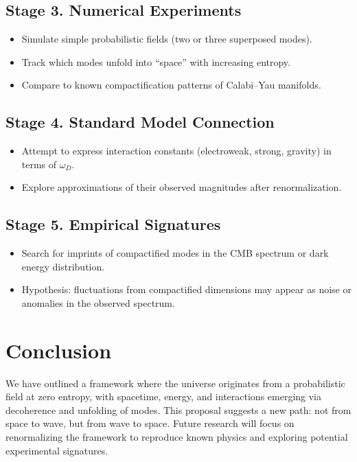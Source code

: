 \documentclass[12pt,a4paper]{article}
\begin{document}
\subsection*{Stage 3. Numerical Experiments}
\begin{itemize}
  \item Simulate simple probabilistic fields (two or three superposed modes).
  \item Track which modes unfold into ``space'' with increasing entropy.
  \item Compare to known compactification patterns of Calabi--Yau manifolds.
\end{itemize}

\subsection*{Stage 4. Standard Model Connection}
\begin{itemize}
  \item Attempt to express interaction constants (electroweak, strong, gravity)
        in terms of $\omega_D$.
  \item Explore approximations of their observed magnitudes after renormalization.
\end{itemize}

\subsection*{Stage 5. Empirical Signatures}
\begin{itemize}
  \item Search for imprints of compactified modes in the CMB spectrum or dark energy distribution.
  \item Hypothesis: fluctuations from compactified dimensions may appear as noise or anomalies in the observed spectrum.
\end{itemize}

\section{Conclusion}
We have outlined a framework where the universe originates from a probabilistic field at zero entropy, with spacetime, energy, and interactions emerging via decoherence and unfolding of modes. This proposal suggests a new path: not from space to wave, but from wave to space. Future research will focus on renormalizing the framework to reproduce known physics and exploring potential experimental signatures.
\end{document}

